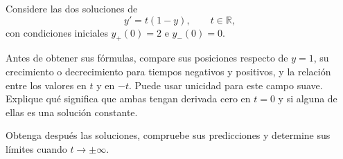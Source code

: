 Considere las dos soluciones de
\[
y'=t(1-y),\qquad t\in\mathbb R,
\]
con condiciones iniciales \(y_+(0)=2\) e \(y_-(0)=0\).

Antes de obtener sus fórmulas, compare sus posiciones respecto de \(y=1\), su crecimiento o decrecimiento para tiempos negativos y positivos, y la relación entre los valores en \(t\) y en \(-t\). Puede usar unicidad para este campo suave. Explique qué significa que ambas tengan derivada cero en \(t=0\) y si alguna de ellas es una solución constante.

Obtenga después las soluciones, compruebe sus predicciones y determine sus límites cuando \(t\to\pm\infty\).
